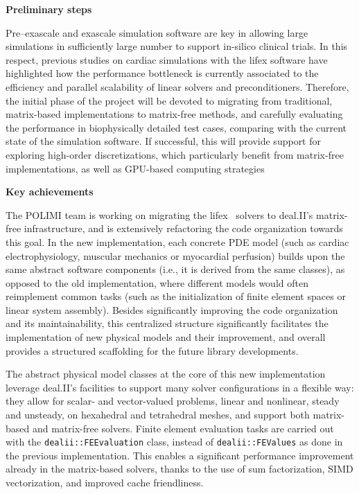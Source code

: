 \documentclass[a4paper,12pt, numbers]{article}
\begin{document}
\noindent\textbf{Preliminary steps}

Pre--exascale and exascale simulation software are key in allowing large simulations in sufficiently large number to support in-silico clinical trials. In this respect, previous studies on cardiac simulations with the lifex software have highlighted how the performance bottleneck is currently associated to the efficiency and parallel scalability of linear solvers and preconditioners.
Therefore, the initial phase of the project will be devoted to migrating from traditional, matrix-based implementations to matrix-free methods, and carefully evaluating the performance in biophysically detailed test cases, comparing with the current state of the simulation software.
If successful, this will provide support for exploring high-order discretizations, which particularly benefit from matrix-free implementations, as well as GPU-based computing strategies

\noindent\textbf{Key achievements}

The POLIMI team is working on migrating the lifex~\cite{lifex2.0} solvers to deal.II's matrix-free infrastructure, and is extensively refactoring the code organization towards this goal. In the new implementation, each concrete PDE model (such as cardiac electrophysiology, muscular mechanics or myocardial perfusion) builds upon the same abstract software components (i.e., it is derived from the same classes), as opposed to the old implementation, where different models would often reimplement common tasks (such as the initialization of finite element spaces or linear system assembly). Besides significantly improving the code organization and its maintainability, this centralized structure significantly facilitates the implementation of new physical models and their improvement, and overall provides a structured scaffolding for the future library developments.

The abstract physical model classes at the core of this new implementation leverage deal.II's facilities to support many solver configurations in a flexible way: they allow for scalar- and vector-valued problems, linear and nonlinear, steady and unsteady, on hexahedral and tetrahedral meshes, and support both matrix-based and matrix-free solvers. Finite element evaluation tasks are carried out with the \texttt{dealii::FEEvaluation} class, instead of \texttt{dealii::FEValues} as done in the previous implementation. This enables a significant performance improvement already in the matrix-based solvers, thanks to the use of sum factorization, SIMD vectorization, and improved cache friendliness.
\end{document}
